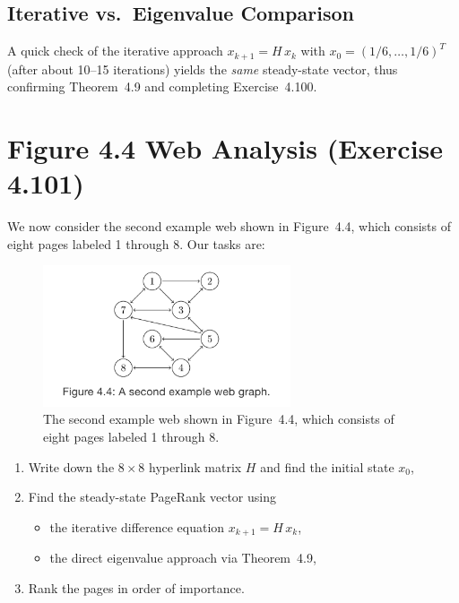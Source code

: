 \documentclass{article}
\begin{document}
\subsection*{Iterative vs.\ Eigenvalue Comparison}
A quick check of the iterative approach 
$x_{k+1} = H \, x_k$ with $x_0 = (1/6, \ldots, 1/6)^T$ 
(after about 10--15 iterations) yields the 
\emph{same} steady-state vector, thus confirming 
Theorem~4.9 and completing Exercise~4.100.



\section{Figure 4.4 Web Analysis (Exercise 4.101)}

We now consider the second example web shown in Figure~4.4, which consists of 
eight pages labeled 1 through 8. Our tasks are:

\begin{figure}[ht]
  \centering
  \includegraphics[width=0.65\textwidth]{img/Node_Tree_4.4.png}
  \caption{%
   The second example web shown in Figure~4.4, which consists of eight pages labeled 1 through 8.
  }
  \label{fig:Node_Tree_4.4}
\end{figure}

\newpage

\begin{enumerate}
  \item Write down the $8\times 8$ hyperlink matrix $H$ and find the initial state $x_0$,
  \item Find the steady-state PageRank vector using 
    \begin{itemize}
      \item the iterative difference equation $x_{k+1} = H\,x_k$, 
      \item the direct eigenvalue approach via Theorem~4.9,
    \end{itemize}
  \item Rank the pages in order of importance.
\end{enumerate}
\end{document}

